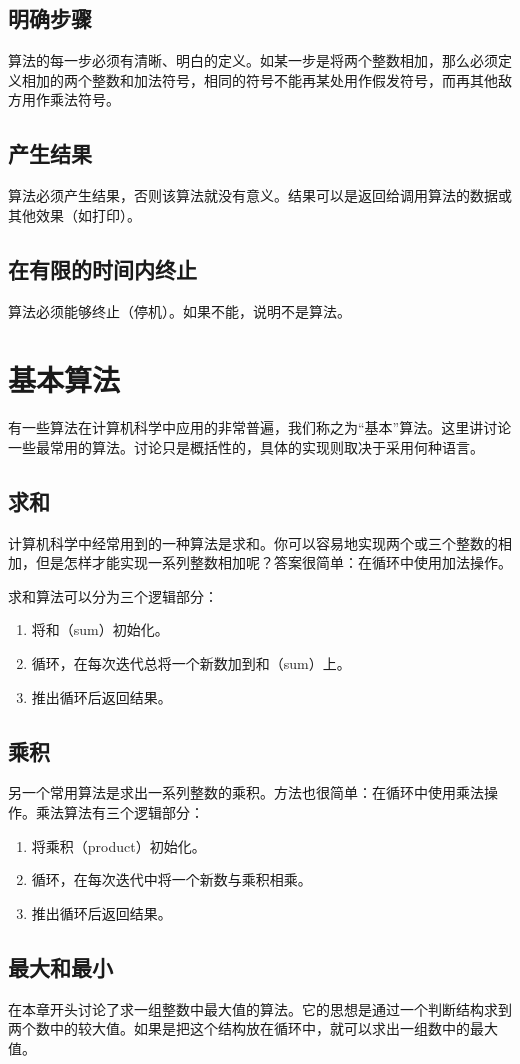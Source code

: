 \subsection{明确步骤}
算法的每一步必须有清晰、明白的定义。如某一步是将两个整数相加，那么必须定义相加的两个整数和加法符号，相同的符号不能再某处用作假发符号，而再其他敌方用作乘法符号。
\subsection{产生结果}
算法必须产生结果，否则该算法就没有意义。结果可以是返回给调用算法的数据或其他效果（如打印）。
\subsection{在有限的时间内终止}
算法必须能够终止（停机）。如果不能，说明不是算法。
\section{基本算法}
有一些算法在计算机科学中应用的非常普遍，我们称之为“基本”算法。这里讲讨论一些最常用的算法。讨论只是概括性的，具体的实现则取决于采用何种语言。
\subsection{求和}
计算机科学中经常用到的一种算法是求和。你可以容易地实现两个或三个整数的相加，但是怎样才能实现一系列整数相加呢？答案很简单：在循环中使用加法操作。

求和算法可以分为三个逻辑部分：
\begin{enumerate}
	\item 将和（sum）初始化。
	\item 循环，在每次迭代总将一个新数加到和（sum）上。
	\item 推出循环后返回结果。
\end{enumerate}
\subsection{乘积}
另一个常用算法是求出一系列整数的乘积。方法也很简单：在循环中使用乘法操作。乘法算法有三个逻辑部分：
\begin{enumerate}
	\item 将乘积（product）初始化。
	\item 循环，在每次迭代中将一个新数与乘积相乘。
	\item 推出循环后返回结果。
\end{enumerate}
\subsection{最大和最小}
在本章开头讨论了求一组整数中最大值的算法。它的思想是通过一个判断结构求到两个数中的较大值。如果是把这个结构放在循环中，就可以求出一组数中的最大值。

